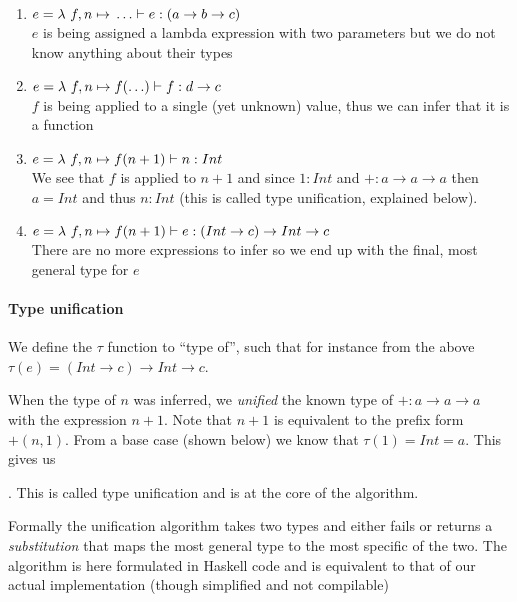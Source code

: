 \begin{enumerate}
\item $e = \lambda{} \ f, n \mapsto{} \ldots \vdash e: (a \to b \to c)$ \\
  $e$ is being assigned a lambda expression with two parameters but we do not know anything about their types
\item $e = \lambda{} \ f, n \mapsto{} f(\ldots) \vdash f: d \to c$ \\
  $f$ is being applied to a single (yet unknown) value, thus we can infer that it is a function
\item $e = \lambda{} \ f, n \mapsto{} f(n + 1) \vdash n : Int$ \\
  We see that $f$ is applied to $n+1$ and since $1: Int$ and $+:a \to a \to a$ then $a = Int$ and thus $n:Int$ (this is called type unification, explained below).
\item $e = \lambda{} \ f, n \mapsto{} f(n + 1) \vdash e : (Int \to c) \to Int \to c$ \\
  There are no more expressions to infer so we end up with the final, most general type for $e$
\end{enumerate}

\paragraph{Type unification}

We define the $\tau$ function to ``type of'', such that for instance from the above $\tau(e) = (Int \to c) \to Int \to c$.

When the type of $n$ was inferred, we \emph{unified} the known type of $+:a \to a \to a$ with the expression $n + 1$. Note that $n + 1$ is equivalent to the prefix form $+(n, 1)$. From a base case (shown below) we know that $\tau(1) = Int = a$. This gives us

. This is called type unification and is at the core of the algorithm.

Formally the unification algorithm takes two types and either fails or returns a \emph{substitution} that maps the most general type to the most specific of the two. The algorithm is here formulated in Haskell code and is equivalent to that of our actual implementation (though simplified and not compilable)

